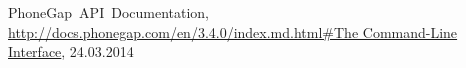 \begin{thebibliography}{xxxxxxxxxxxxxxxxxxx}
   PhoneGap\ API\ Documentation, \url{http://docs.phonegap.com/en/3.4.0/index.md.html\#The Command-Line Interface}, 24.03.2014
\end{thebibliography}